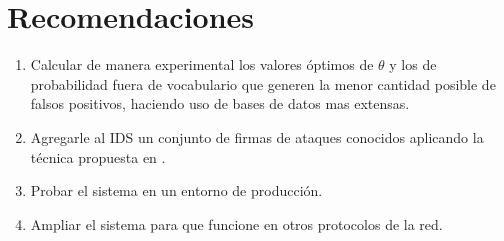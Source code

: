 \section*{Recomendaciones}

\begin{enumerate}
\item Calcular de manera experimental los valores óptimos de $\theta$ y los de probabilidad fuera de vocabulario que generen la menor cantidad posible de falsos positivos, haciendo uso de bases de datos mas extensas.
\item Agregarle al IDS un conjunto de firmas de ataques conocidos aplicando la técnica propuesta en \cite{firmas}.
\item Probar el sistema en un entorno de producción.
\item Ampliar el sistema para que funcione en otros protocolos de la red.
\end{enumerate}
